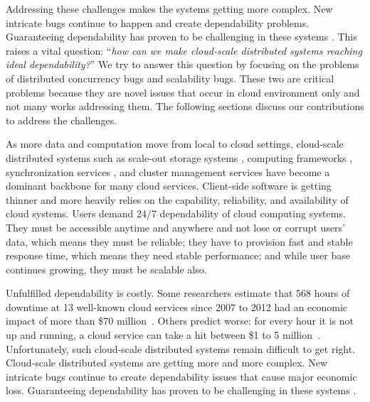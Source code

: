 
Addressing these challenges makes the systems getting more complex. New
intricate bugs continue to happen and create dependability problems.
Guaranteeing dependability has proven to be challenging in these systems
\cite{Gunawi+11-FateDestini, Guo+11-Demeter, Wang+14-Exalt, Yang+09-Modist}.
This raises a vital question: ``{\em how can we make cloud-scale distributed
systems reaching ideal dependability?}'' We try to answer this question by
focusing on the problems of distributed concurrency bugs and scalability bugs.
These two are critical problems because they are novel issues that occur in
cloud environment only and not many works addressing them.  The following
sections discuss our contributions to address the challenges.


As more data and computation move from local to cloud settings, cloud-scale
distributed systems such as scale-out storage systems \cite{Chang+06-BigTable,
DeCandia+07-Dynamo, Ghemawat+03-GoogleFS, Nightingale+12-FlatFDS}, computing
frameworks \cite{DeanGhemawat04-MapReduce, Murray+13-NaiadTimelyDataflow},
synchronization services \cite{Burrows06-Chubby, Hunt+10-ZooKeeperPaper}, and
cluster management services \cite{Hindman+11-Mesos, Kumar+13-Yarn} have become a
dominant backbone for many cloud services. Client-side software is getting
thinner and more heavily relies on the capability, reliability, and availability
of cloud systems. Users demand 24/7 dependability of cloud computing systems.
They must be accessible anytime and anywhere and not lose or corrupt users'
data, which means they must be reliable; they have to provision fast and stable
response time, which means they need stable performance; and while user base
continues growing, they must be scalable also.

Unfulfilled dependability is costly. Some researchers estimate that 568 hours of
downtime at 13 well-known cloud services since 2007 to 2012 had an economic
impact of more than \$70 million~\cite{Essers12-70Million}. Others predict
worse: for every hour it is not up and running, a cloud service can take a hit
between \$1 to 5 million~\cite{Linthicum13-InfoworldCostOutages}.
Unfortunately, such cloud-scale distributed systems remain difficult to get
right. 
%
Cloud-scale distributed systems are getting more and more complex. New intricate
bugs continue to create dependability issues that cause major economic loss.
Guaranteeing dependability has proven to be challenging in these systems
\cite{Gunawi+11-FateDestini, Guo+11-Demeter, Wang+14-Exalt, Yang+09-Modist}.

